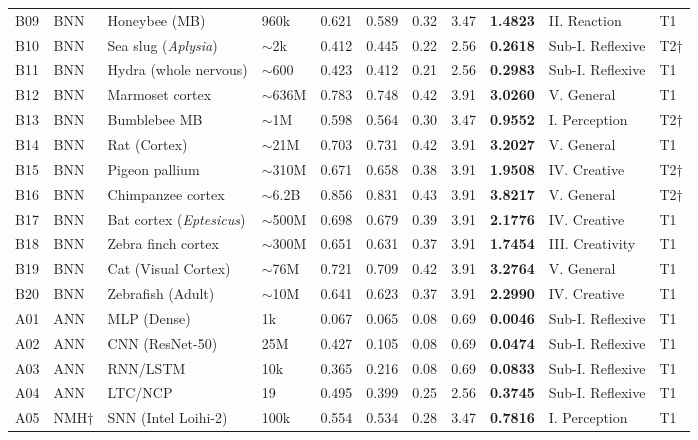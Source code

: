 \documentclass[12pt]{article}
\begin{document}
\begin{longtable}{p{0.6cm}p{0.7cm}p{3.2cm}p{1.0cm}p{0.7cm}p{0.7cm}p{0.7cm}p{0.7cm}p{0.9cm}p{1.8cm}p{0.5cm}}
B09 & BNN & Honeybee (MB) & 960k & 0.621 & 0.589 & 0.32 & 3.47 & \textbf{1.4823} & II. Reaction & T1 \\
B10 & BNN & Sea slug (\textit{Aplysia}) & $\sim$2k & 0.412 & 0.445 & 0.22 & 2.56 & \textbf{0.2618} & Sub-I. Reflexive & T2$\dagger$ \\
B11 & BNN & Hydra (whole nervous) & $\sim$600 & 0.423 & 0.412 & 0.21 & 2.56 & \textbf{0.2983} & Sub-I. Reflexive & T1 \\
B12 & BNN & Marmoset cortex & $\sim$636M & 0.783 & 0.748 & 0.42 & 3.91 & \textbf{3.0260} & V. General & T1 \\
B13 & BNN & Bumblebee MB & $\sim$1M & 0.598 & 0.564 & 0.30 & 3.47 & \textbf{0.9552} & I. Perception & T2$\dagger$ \\
B14 & BNN & Rat (Cortex) & $\sim$21M & 0.703 & 0.731 & 0.42 & 3.91 & \textbf{3.2027} & V. General & T1 \\
B15 & BNN & Pigeon pallium & $\sim$310M & 0.671 & 0.658 & 0.38 & 3.91 & \textbf{1.9508} & IV. Creative & T2$\dagger$ \\
B16 & BNN & Chimpanzee cortex & $\sim$6.2B & 0.856 & 0.831 & 0.43 & 3.91 & \textbf{3.8217} & V. General & T2$\dagger$ \\
B17 & BNN & Bat cortex (\textit{Eptesicus}) & $\sim$500M & 0.698 & 0.679 & 0.39 & 3.91 & \textbf{2.1776} & IV. Creative & T1 \\
B18 & BNN & Zebra finch cortex & $\sim$300M & 0.651 & 0.631 & 0.37 & 3.91 & \textbf{1.7454} & III. Creativity & T1 \\
B19 & BNN & Cat (Visual Cortex) & $\sim$76M & 0.721 & 0.709 & 0.42 & 3.91 & \textbf{3.2764} & V. General & T1 \\
B20 & BNN & Zebrafish (Adult) & $\sim$10M & 0.641 & 0.623 & 0.37 & 3.91 & \textbf{2.2990} & IV. Creative & T1 \\
\midrule
A01 & ANN & MLP (Dense) & 1k & 0.067 & 0.065 & 0.08 & 0.69 & \textbf{0.0046} & Sub-I. Reflexive & T1 \\
A02 & ANN & CNN (ResNet-50) & 25M & 0.427 & 0.105 & 0.08 & 0.69 & \textbf{0.0474} & Sub-I. Reflexive & T1 \\
A03 & ANN & RNN/LSTM & 10k & 0.365 & 0.216 & 0.08 & 0.69 & \textbf{0.0833} & Sub-I. Reflexive & T1 \\
A04 & ANN & LTC/NCP & 19 & 0.495 & 0.399 & 0.25 & 2.56 & \textbf{0.3745} & Sub-I. Reflexive & T1 \\
A05 & NMH$\dagger$ & SNN (Intel Loihi-2) & 100k & 0.554 & 0.534 & 0.28 & 3.47 & \textbf{0.7816} & I. Perception & T1 \\

\end{longtable}
\end{document}
